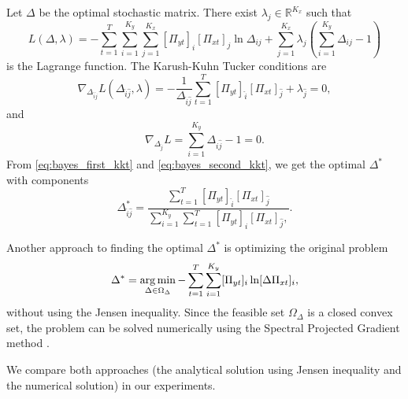 Let $\Delta$ be the optimal stochastic matrix. There exist $\lambda_j \in \mathbb{R}^{K_x}$ such that
\begin{equation}
    L(\Delta, \lambda) = - \sum_{t=1}^T \sum_{i=1}^{K_y} \sum_{j=1}^{K_x} [\Pi_{yt}]_i [\Pi_{xt}]_j \ln \Delta_{ij} + \sum_{j=1}^{K_x} \lambda_j (\sum_{i=1}^{K_y} \Delta_{ij} - 1)
\end{equation}
is the Lagrange function. The Karush-Kuhn Tucker conditions are
\begin{equation}
    \nabla_{\Delta_{\hat{i}\hat{j}}} L(\Delta_{\hat{i}\hat{j}}, \lambda) = - \frac{1}{\Delta_{\hat{i}\hat{j}}} \sum_{t=1}^{T} [\Pi_{yt}]_{\hat{i}} [\Pi_{xt}]_{\hat{j}} + \lambda_{\hat{j}} = 0,
    \label{eq:bayes_first_kkt}
\end{equation}
and
\begin{equation}
    \nabla_{\Delta_{\hat{j}}} L = \sum_{i=1}^{K_y} \Delta_{i\hat{j}} - 1 = 0.
    \label{eq:bayes_second_kkt}
\end{equation}
From \eqref{eq:bayes_first_kkt} and \eqref{eq:bayes_second_kkt}, we get the optimal $\Delta^*$ with components
\begin{equation}
    \Delta_{\hat{i}\hat{j}}^{*} = \frac{\sum_{t=1}^{T} [\Pi_{yt}]_{\hat{i}} [\Pi_{xt}]_{\hat{j}}}{\sum_{i=1}^{K_y} \sum_{t=1}^{T} [\Pi_{yt}]_{i} [\Pi_{xt}]_{\hat{j}},}.
\end{equation}

Another approach to finding the optimal $\Delta^{*}$ is optimizing the original problem
\begin{equation}
    \Delta^* = \operatorname*{arg\,min}_{\Delta \in \Omega_{\Delta}} - \sum_{t=1}^T \sum_{i=1}^{K_y} [\Pi_{yt}]_i \ln [\Delta\Pi_{xt}]_i,
\end{equation}
without using the Jensen inequality. Since the feasible set $\Omega_{\Delta}$ is a closed convex set, the problem can be solved numerically using the Spectral Projected Gradient method \cite{birgin2000}.

We compare both approaches (the analytical solution using Jensen inequality and the numerical solution) in our experiments.
